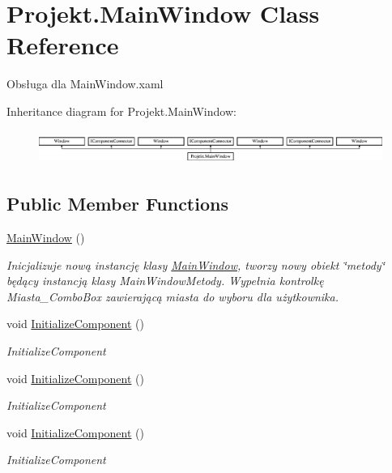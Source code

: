 \hypertarget{class_projekt_1_1_main_window}{}\section{Projekt.\+Main\+Window Class Reference}
\label{class_projekt_1_1_main_window}


Obsługa dla Main\+Window.\+xaml  


Inheritance diagram for Projekt.\+Main\+Window\+:\begin{figure}[H]
\begin{center}
\leavevmode
\includegraphics[height=1.103448cm]{class_projekt_1_1_main_window}
\end{center}
\end{figure}
\subsection*{Public Member Functions}
\begin{DoxyCompactItemize}
\item 
\mbox{\hyperlink{class_projekt_1_1_main_window_a89444390c3a3744103a7c26465058420}{Main\+Window}} ()
\begin{DoxyCompactList}\small\item\em Inicjalizuje nową instancję klasy \mbox{\hyperlink{class_projekt_1_1_main_window}{Main\+Window}}, tworzy nowy obiekt \char`\"{}metody\char`\"{} będący instancją klasy Main\+Window\+Metody. Wypełnia kontrolkę Miasta\+\_\+\+Combo\+Box zawierającą miasta do wyboru dla użytkownika. \end{DoxyCompactList}\item 
void \mbox{\hyperlink{class_projekt_1_1_main_window_a77dc8af65f12c129fb0c59a57d52f46d}{Initialize\+Component}} ()
\begin{DoxyCompactList}\small\item\em Initialize\+Component \end{DoxyCompactList}\item 
void \mbox{\hyperlink{class_projekt_1_1_main_window_a77dc8af65f12c129fb0c59a57d52f46d}{Initialize\+Component}} ()
\begin{DoxyCompactList}\small\item\em Initialize\+Component \end{DoxyCompactList}\item 
void \mbox{\hyperlink{class_projekt_1_1_main_window_a77dc8af65f12c129fb0c59a57d52f46d}{Initialize\+Component}} ()
\begin{DoxyCompactList}\small\item\em Initialize\+Component \end{DoxyCompactList}\end{DoxyCompactItemize}


